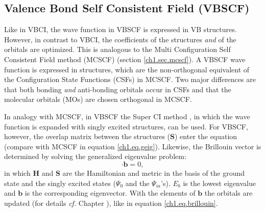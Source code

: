 \subsection{\label{ch1.sec.vbscf}Valence Bond Self Consistent Field (VBSCF)}

Like in VBCI, the wave function in VBSCF is expressed in VB structures. However, in contrast to VBCI, the coefficients of the structures \textit{and} of the orbitals are optimized. This is analogous to the Multi Configuration Self Consistent Field method (MCSCF) (section \ref{ch1.sec.mcscf}). A VBSCF wave function is  expressed in structures, which are the non-orthogonal equivalent of the Configuration State Functions (CSFs) in MCSCF.  Two major differences are that both bonding \textit{and} anti-bonding orbitals occur in CSFs and that the molecular orbitals (MOs) are chosen orthogonal in MCSCF.

In analogy with MCSCF, in VBSCF the Super CI method \cite{superci1,superci2}, in which the wave function is expanded with singly excited structures, can be used. For VBSCF, however, the overlap matrix between the structures ($\mathbf{S}$) enter the equation (compare with MCSCF in equation \ref{ch1.eq.geig}). Likewise, the  Brillouin vector is determined by solving the generalized eigenvalue problem:
\begin{equation}
[\mathbf{H}-E_b\mathbf{S}] \cdot \mathbf{b} = 0,
\label{ch1.eq.geigvb}
\end{equation}
in which $\mathbf{H}$ and $\mathbf{S}$ are the Hamiltonian and metric in the basis of the ground state and the singly excited states ($\Psi_0$ and the $\Psi_{ia}$'s). $E_b$ is the lowest eigenvalue and $\mathbf{b}$ is the corresponding eigenvector. With the elements of $\mathbf{b}$ the orbitals are updated (for details  \textit{cf.} Chapter \chorbopt), like in equation \ref{ch1.eq.brillouin}.

